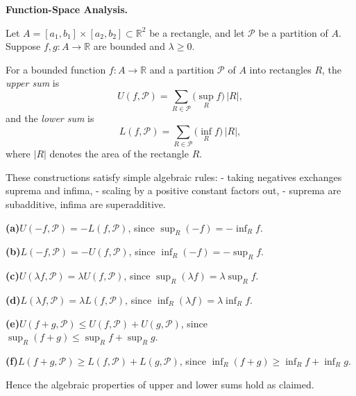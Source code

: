 \begin{problem}[CP-II-0025]
\label{prob:cp-ii-0025}
\textbf{Function-Space Analysis.}

\hspace*{1.5em}Let $A=[a_1,b_1]\times[a_2,b_2]\subset\mathbb{R}^2$ be a rectangle, and let $\mathcal{P}$ be a partition of $A$.
Suppose $f,g:A\to\mathbb{R}$ are bounded and $\lambda\geq 0$.

For a bounded function $f:A\to\mathbb{R}$ and a partition $\mathcal{P}$ of $A$ into rectangles $R$, the \emph{upper sum} is
\[
U(f,\mathcal{P})=\sum_{R\in \mathcal{P}} \big(\sup_{R} f\big)\,|R|,
\]
and the \emph{lower sum} is
\[
L(f,\mathcal{P})=\sum_{R\in \mathcal{P}} \big(\inf_{R} f\big)\,|R|,
\]
where $|R|$ denotes the area of the rectangle $R$.

These constructions satisfy simple algebraic rules:
- taking negatives exchanges suprema and infima,
- scaling by a positive constant factors out,
- suprema are subadditive, infima are superadditive.

	\par\smallskip\noindent\textbf{(a)}\quad $U(-f,\mathcal{P})=-L(f,\mathcal{P})$, since $\sup_R(-f)=-\inf_R f$.
	\par\smallskip\noindent\textbf{(b)}\quad $L(-f,\mathcal{P})=-U(f,\mathcal{P})$, since $\inf_R(-f)=-\sup_R f$.
	\par\smallskip\noindent\textbf{(c)}\quad $U(\lambda f,\mathcal{P})=\lambda U(f,\mathcal{P})$, since $\sup_R(\lambda f)=\lambda\sup_R f$.
	\par\smallskip\noindent\textbf{(d)}\quad $L(\lambda f,\mathcal{P})=\lambda L(f,\mathcal{P})$, since $\inf_R(\lambda f)=\lambda\inf_R f$.
	\par\smallskip\noindent\textbf{(e)}\quad $U(f+g,\mathcal{P})\leq U(f,\mathcal{P})+U(g,\mathcal{P})$, since $\sup_R(f+g)\leq \sup_R f+\sup_R g$.
	\par\smallskip\noindent\textbf{(f)}\quad $L(f+g,\mathcal{P})\geq L(f,\mathcal{P})+L(g,\mathcal{P})$, since $\inf_R(f+g)\geq \inf_R f+\inf_R g$.

Hence the algebraic properties of upper and lower sums hold as claimed.
\end{problem}

